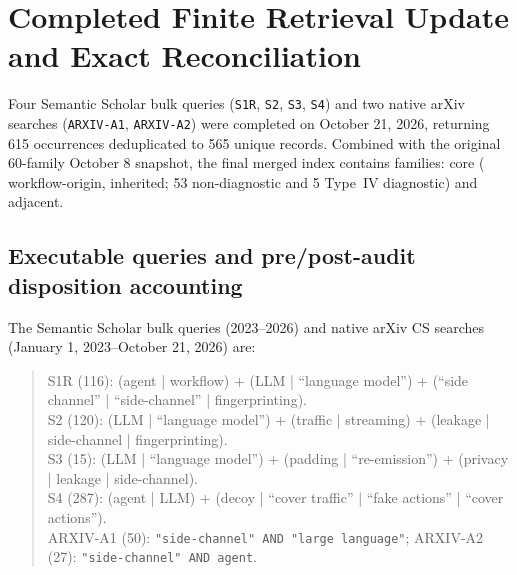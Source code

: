 \section{Completed Finite Retrieval Update and Exact Reconciliation}\label{app:search-update}
Four Semantic Scholar bulk queries (\texttt{S1R}, \texttt{S2}, \texttt{S3}, \texttt{S4}) and two native arXiv searches (\texttt{ARXIV-A1}, \texttt{ARXIV-A2}) were completed on October 21, 2026, returning 615 occurrences deduplicated to 565 unique records. Combined with the original 60-family October 8 snapshot, the final merged index contains \FinalN{} families: \FinalCore{} core (\FinalA{} workflow-origin, \FinalB{} inherited; 53 non-diagnostic and 5 Type~IV diagnostic) and \FinalAdjacent{} adjacent.

\subsection{Executable queries and pre/post-audit disposition accounting}
The Semantic Scholar bulk queries (2023--2026) and native arXiv CS searches (January 1, 2023--October 21, 2026) are:
\begin{quote}\small\raggedright
S1R (116): (agent | workflow) + (LLM | ``language model'') + (``side channel'' | ``side-channel'' | fingerprinting).\\
S2 (120): (LLM | ``language model'') + (traffic | streaming) + (leakage | side-channel | fingerprinting).\\
S3 (15): (LLM | ``language model'') + (padding | ``re-emission'') + (privacy | leakage | side-channel).\\
S4 (287): (agent | LLM) + (decoy | ``cover traffic'' | ``fake actions'' | ``cover actions'').\\
ARXIV-A1 (50): \texttt{"side-channel" AND "large language"}; ARXIV-A2 (27): \texttt{"side-channel" AND agent}.
\end{quote}

